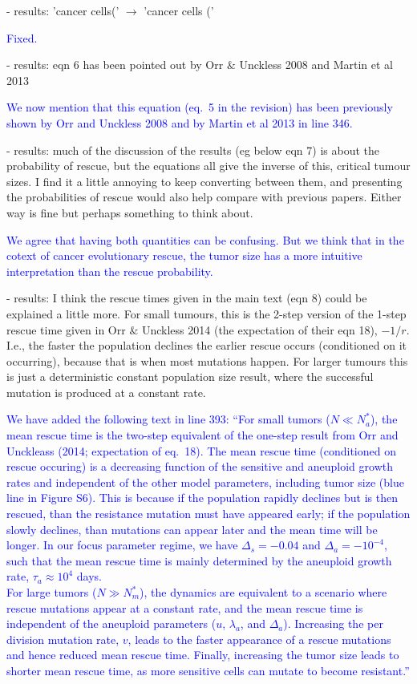 \documentclass[12pt]{extarticle}
\begin{document}
- results: 'cancer cells(' $\rightarrow$ 'cancer cells ('

\textcolor{blue}{Fixed.} %

- results: eqn 6 has been pointed out by Orr $\&$ Unckless 2008 and Martin et al 2013

\textcolor{blue}{%
We now mention that this equation (eq.~5 in the revision) has been previously shown by Orr and Unckless 2008 and by Martin et al 2013 in line 346.
} 

- results: much of the discussion of the results (eg below eqn 7) is about the probability of rescue, but the equations all give the inverse of this, critical tumour sizes. I find it a little annoying to keep converting between them, and presenting the probabilities of rescue would also help compare with previous papers. Either way is fine but perhaps something to think about.

\textcolor{blue}{
We agree that having both quantities can be confusing. But we think that in the cotext of cancer evolutionary rescue, the tumor size has a more intuitive interpretation than the rescue probability.
}

- results: I think the rescue times given in the main text (eqn 8) could be explained a little more. For small tumours, this is the 2-step version of the 1-step rescue time given in Orr $\&$ Unckless 2014 (the expectation of their eqn 18), $-1/r$. I.e., the faster the population declines the earlier rescue occurs (conditioned on it occurring), because that is when most mutations happen. For larger tumours this is just a deterministic constant population size result, where the successful mutation is produced at a constant rate.

\textcolor{blue}{%
We have added the following text in line 393: ``For small tumors ($ N \ll N_a^*$), the mean rescue time is the two-step equivalent of the one-step result from Orr and Unckleass (2014; expectation of eq.~18). The mean rescue time (conditioned on rescue occuring) is a decreasing function of the sensitive and aneuploid growth rates and independent of the other model parameters, including tumor size (blue line in Figure S6). This is because if the population rapidly declines but is then rescued, than the resistance mutation must have appeared early; if the population slowly declines, than mutations can appear later and the mean time will be longer. In our focus parameter regime, we have $\Delta_s=-0.04$ and $\Delta_a=-10^{-4}$, such that the mean rescue time is mainly determined by the aneuploid growth rate, $\tau_a \approx 10^4$ days. 
\\
For large tumors ($N \gg N_m^*$), the dynamics are equivalent to a scenario where rescue mutations appear at a constant rate, and the mean rescue time is independent of the aneuploid parameters ($u$, $\lambda_a$, and $\Delta_a$). Increasing the per division mutation rate, $v$, leads to the faster appearance of a rescue mutations and hence reduced mean rescue time. Finally, increasing the tumor size leads to shorter mean rescue time, as more sensitive cells can mutate to become resistant.''
}
\end{document}
